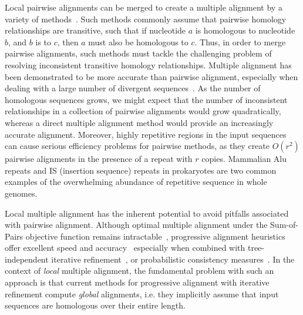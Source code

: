 \documentclass[12pt,journal,letterpaper,onecolumn, draftcls]{IEEEtran}
\begin{document}
Local pairwise alignments can be merged to create a multiple alignment by a variety of
methods~\cite{ref-tba,ref-dialign,ref-related1}. Such methods commonly assume that pairwise homology relationships are transitive, such that if nucleotide $a$ is homologous to nucleotide $b$, and $b$ is to $c$, then $a$ must also be homologous to $c$.  Thus, in order to merge pairwise alignments, such methods must tackle the challenging problem of resolving inconsistent transitive homology relationships.
Multiple alignment has been demonstrated to be more accurate than pairwise alignment, especially when dealing with a large number of divergent sequences~\cite{ref-mlagan,ref-aubergene}.  As the number of homologous sequences grows, we might expect that the number of inconsistent relationships in a collection of pairwise alignments would grow quadratically, whereas a direct multiple alignment method would provide an increasingly accurate alignment.  Moreover, highly repetitive regions in the input sequences can cause serious efficiency
problems for pairwise methods, as they create $O(r^{2})$ pairwise alignments in the presence of a repeat with $r$ copies.  Mammalian Alu repeats and IS (insertion sequence) repeats in prokaryotes are two common examples of the overwhelming abundance of repetitive sequence in whole genomes.

Local multiple alignment has the inherent potential to avoid pitfalls associated with pairwise alignment. Although optimal multiple alignment under the Sum-of-Pairs objective function remains intractable~\cite{ref-wangjiang}, progressive alignment heuristics offer excellent speed and accuracy~\cite{ref-clustalw,ref-tcoffee} especially when combined with tree-independent iterative
refinement~\cite{ref-muscle}, or probabilistic consistency measures~\cite{ref-probcons}. In the context of \textit{local}
multiple alignment, the fundamental problem with such an approach is
that current methods for progressive alignment with iterative
refinement compute \textit{global} alignments, i.e. they implicitly
assume that input sequences are homologous over their entire length.
\end{document}

